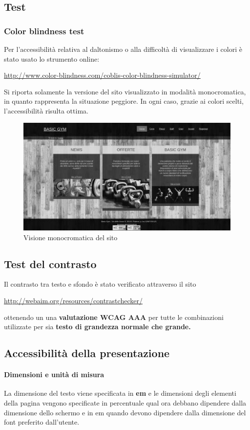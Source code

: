 \documentclass[12pt,a4paper]{article}
\begin{document}
\subsection{Test  }
\subsubsection{Color blindness test}
Per l'accessibilità relativa al daltonismo o alla difficoltà di visualizzare i colori è stato usato lo strumento online: 	
\begin{center}
	\url{http://www.color-blindness.com/coblis-color-blindness-simulator/}
\end{center}
Si riporta solamente la versione del sito visualizzato in modalità monocromatica, in quanto rappresenta la situazione peggiore. 
In ogni caso, grazie ai colori scelti, l'accessibilità risulta ottima. 
\begin{figure}[h]
\centering
\includegraphics[width=0.6\linewidth]{img/colorblind/07}
\caption{Visione monocromatica del sito}
\label{fig:07}
\end{figure}


\subsection{Test del contrasto}
Il contrasto tra testo e sfondo è stato verificato attraverso il sito 
\begin{center}
	\url{http://webaim.org/resources/contrastchecker/}
\end{center}
ottenendo un una \textbf{valutazione WCAG AAA} per tutte le combinazioni utilizzate per sia \textbf{testo di grandezza normale che grande.}

\subsection{Accessibilità della presentazione}
\paragraph{Dimensioni e unità di misura} La dimensione del testo viene specificata in \textbf{em} e le dimensioni degli elementi della pagina vengono specificate in percentuale qual ora debbano dipendere dalla dimensione dello schermo e in em quando devono dipendere dalla dimensione del font preferito dall'utente. 
\end{document}
